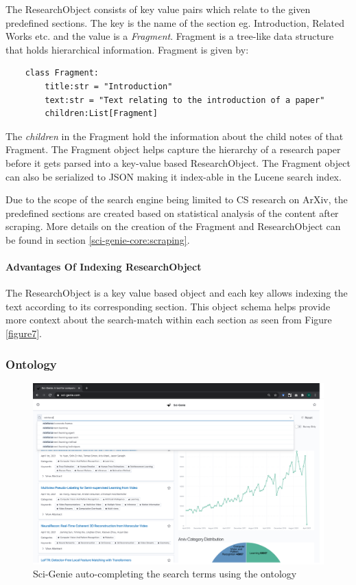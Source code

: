The ResearchObject consists of key value pairs which relate to the given predefined sections. The key is the name of the section eg. Introduction, Related Works etc. and the value is a \textit{Fragment}. 
Fragment is a tree-like data structure that holds hierarchical information. Fragment is given by:
\begin{verbatim}
    class Fragment:
        title:str = "Introduction"
        text:str = "Text relating to the introduction of a paper"
        children:List[Fragment] 
\end{verbatim}    

The \textit{children} in the Fragment hold the information about the child notes of that Fragment. The Fragment object helps capture the hierarchy of a research paper before it gets parsed into a key-value based ResearchObject. The Fragment object can also be serialized to JSON making it index-able in the Lucene search index.  

Due to the scope of the search engine being limited to CS research on ArXiv, the predefined sections are created based on statistical analysis of the content after scraping. More details on the creation of the Fragment and ResearchObject can be found in section \ref{sci-genie-core:scraping}. 

\paragraph{Advantages Of Indexing ResearchObject}
The ResearchObject is a key value based object and each key allows indexing the text according to its corresponding section. This object schema helps provide more context about the search-match within each section as seen from Figure \ref{figure7}. 

\subsubsection{Ontology}
\begin{figure}[h]
    \centering
    \includegraphics[width=\maxwidth{\textwidth}]{src/images/sci-genie-autocomp-example.png}
    \caption{Sci-Genie auto-completing the search terms using the ontology}
    \label{figure\arabic{figurecounter}}
\end{figure}


